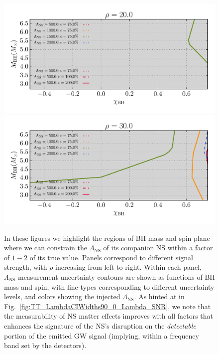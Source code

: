 \documentclass[aps,prd,amsmath,floats,floatfix, twocolumn,
superscriptaddress,nofootinbib,showpacs]{revtex4-1}
\newcommand{\lambdans}{\Lambda_\mathrm{NS}}
\begin{document}
%
\begin{figure}
\centering    
\includegraphics[width=1.025\columnwidth]{plots/TTLambdaErrorCurves_BHspin_BHmass_SNR20_CI90_0.pdf}
\includegraphics[width=1.025\columnwidth]{plots/TTLambdaErrorCurves_BHspin_BHmass_SNR30_CI90_0.pdf}
\caption{In these figures we highlight the regions of BH mass and spin plane where we can 
constrain the $\lambdans$ of its companion NS within a factor of $1-2$ of its true value.
Panels correspond to different signal strength, with $\rho$ increasing from left to right.
Within each panel, $\lambdans$ measurement uncertainty contours are shown as functions of BH 
mass and spin, with line-types corresponding to different uncertainty levels, and
colors showing the injected $\lambdans$.
As hinted at in Fig.~\ref{fig:TT_LambdaCIWidths90_0_Lambda_SNR}, we note that the measurability
of NS matter
effects improves with all factors that enhances the signature of the NS's disruption on
the \textit{detectable} portion of the emitted GW signal (implying, within a frequency band
set by the detectors).
}
\label{fig:TT_LambdaErrorCurves_BHspin_BHmass_CI90_0}
\end{figure}
\end{document}
